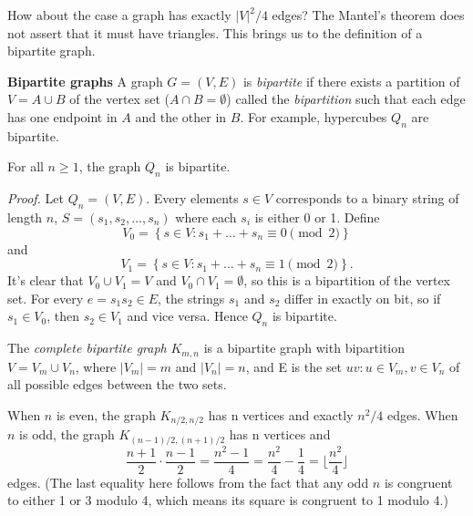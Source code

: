 \documentclass{tufte-handout}
\begin{document}
How about the case a graph has exactly \(\left|V\right|^2\slash 4 \) edges? 
The Mantel's theorem does not assert that it must have triangles.
This brings us to the definition of a bipartite graph.

\textbf{Bipartite graphs} A graph \( G = (V,E) \) is \textit{bipartite} if there exists
a partition of \( V = A \cup B \) of the vertex set (\( A\cap B = \emptyset\)) called the \textit{bipartition}
such that each edge has one endpoint in \( A \) and the other in \( B \).
For example, hypercubes \( Q_n \) are bipartite.

\begin{Proposition}
    For all \( n \geq 1 \), the graph \( Q_n \) is bipartite.
\end{Proposition}
\textit{Proof.} Let \( Q_n = (V,E) \). Every elements \( s\in V \) corresponds to a binary string of length \( n \),
\( S = (s_1, s_2, \ldots, s_n) \) where each \( s_i \) is either 0 or 1. Define
\[V_0 = \left\{s\in V: s_1 + \dots + s_n \equiv 0 \pmod 2\right\}\]
and
\[V_1 = \left\{s\in V: s_1 + \dots + s_n \equiv 1 \pmod 2\right\}.\]
It's clear that \( V_0 \cup V_1 =V \) and \( V_0 \cap V_1 = \emptyset \), so this is a bipartition of the vertex set.
For every \( e = s_1s_2 \in E \), the strings \( s_1 \) and \( s_2 \) differ in exactly on bit, so if
\( s_1 \in V_0 \), then \( s_2 \in V_1 \) and vice versa. Hence \( Q_n \) is bipartite. \qedsymbol

The \textit{complete bipartite graph} \( K_{m,n} \) is a bipartite graph with bipartition \( V = V_m \cup V_n \), where
\( \left|V_m\right| = m \) and \( \left|V_n\right| = n \), and E is the set \( {uv: u\in V_m, v\in V_n} \) of
all possible edges between the two sets.

When \( n \) is even, the graph \( K_{n/2,n/2} \) has n vertices and exactly \( n^2\slash 4 \) edges.
When \( n \) is odd, the graph \( K_{(n-1)/2,(n+1)/2} \) has n vertices and 
\[\frac{n+1}{2}\cdot \frac{n-1}{2} = \frac{n^2-1}{4} = \frac{n^2}{4}-\frac{1}{4} = \lfloor \frac{n^2}{4} \rfloor\]
edges. (The last equality here follows from the fact that any odd \( n \) is congruent to either 1 or 3 modulo 4,
which means its square is congruent to 1 modulo 4.)
\end{document}
